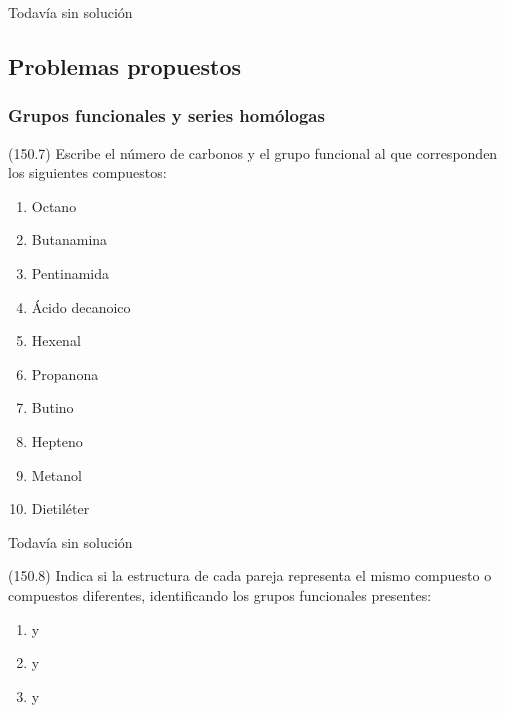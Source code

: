 \documentclass[10pt,a5paper,twoside]{article}
\begin{document}
  \begin{solution}[print=false]
    Todavía sin solución
  \end{solution}






  \subsection*{Problemas propuestos}

  \subsubsection*{Grupos funcionales y series homólogas}

  \begin{exercise}[
      tags    = {},
      topics  = {química, química orgánica, orgánica},
      source  = {FQ 1B MGH 2016, p150, e7},
    ]
    (150.7) Escribe el número de carbonos y el grupo funcional al que
    corresponden los siguientes compuestos:
    \begin{enumerate}
      \item Octano
      \item Butanamina
      \item Pentinamida
      \item Ácido decanoico
      \item Hexenal
      \item Propanona
      \item Butino
      \item Hepteno
      \item Metanol
      \item Dietiléter
    \end{enumerate}
  \end{exercise}

  \begin{solution}[print=false]
    Todavía sin solución
  \end{solution}




  \begin{exercise}[
      tags    = {},
      topics  = {química, química orgánica, orgánica},
      source  = {FQ 1B MGH 2016, p150, e8},
    ]
    (150.8) Indica si la estructura de cada pareja representa el mismo
    compuesto o compuestos diferentes, identificando los grupos
    funcionales presentes:
    \begin{enumerate}
      \item {} y 
      \item {} y 
      \item {} y 
    \end{enumerate}
  \end{exercise}
\end{document}

